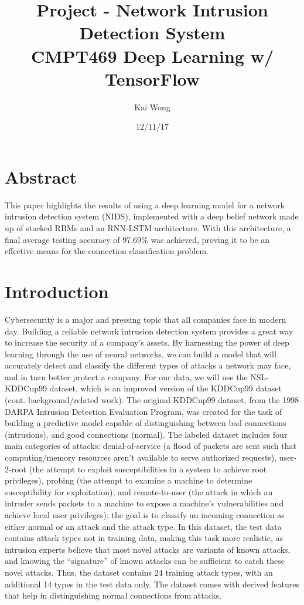 \documentclass[a4paper]{article}
\title{Project - Network Intrusion Detection System\\CMPT469 Deep Learning w/ TensorFlow}
\author{Kai Wong}
\date{12/11/17}
\begin{document}
\maketitle

\section{Abstract}
\hspace*{10mm}This paper highlights the results of using a deep learning model for a network intrusion detection system (NIDS), implemented with a deep belief network made up of stacked RBMs and an RNN-LSTM architecture. With this architecture, a final average testing accuracy of 97.69\% was achieved, proving it to be an effective means for the connection classification problem.

\section{Introduction}
\hspace*{10mm}Cybersecurity is a major and pressing topic that all companies face in modern day. Building a reliable network intrusion detection system provides a great way to increase the security of a company's assets. By harnessing the power of deep learning through the use of neural networks, we can build a model that will accurately detect and classify the different types of attacks a network may face, and in turn better protect a company. For our data, we will use the NSL-KDDCup99 dataset, which is an improved version of the KDDCup99 dataset (cont. background/related work). The original KDDCup99 dataset, from the 1998 DARPA Intrusion Detection Evaluation Program, was created for the task of building a predictive model capable of distinguishing between bad connections (intrusions), and good connections (normal). The labeled dataset includes four main categories of attacks: denial-of-service (a flood of packets are sent such that computing/memory resources aren't available to serve authorized requests), user-2-root (the attempt to exploit susceptibilities in a system to achieve root privileges), probing (the attempt to examine a machine to determine susceptibility for exploitation), and remote-to-user (the attack in which an intruder sends packets to a machine to expose a machine’s vulnerabilities and achieve local user privileges); the goal is to classify an incoming connection as either normal or an attack and the attack type. In this dataset, the test data contains attack types not in training data, making this task more realistic, as intrusion experts believe that most novel attacks are variants of known attacks, and knowing the “signature” of known attacks can be sufficient to catch these novel attacks. Thus, the dataset contains 24 training attack types, with an additional 14 types in the test data only. The dataset comes with derived features that help in distinguishing normal connections from attacks.
\end{document}
